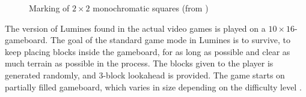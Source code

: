 \begin{figure}[H]
    \centering
    \caption{Marking of $2 \times 2$ monochromatic squares (from \cite{lumines})}
\end{figure}

The version of Lumines found in the actual video games is played on a $10 \times 16$-gameboard. The goal of the standard game mode in Lumines is to survive, to keep placing blocks inside the gameboard, for as long as possible and clear as much terrain as possible in the process. The blocks given to the player is generated randomly, and 3-block lookahead is provided. The game starts on partially filled gameboard, which varies in size depending on the difficulty level \cite{lumines}.

